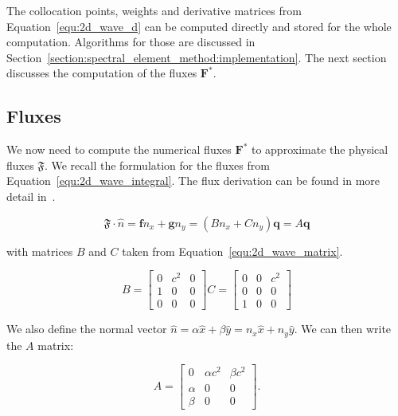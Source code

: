 The collocation points, weights and derivative matrices from Equation~\ref{equ:2d_wave_d} can be
computed directly and stored for the whole computation. Algorithms for those are discussed in
Section~\ref{section:spectral_element_method:implementation}. The next section discusses the
computation of the fluxes \(\mathbf{F}^*\).

\subsection{Fluxes}\label{subsection:spectral_element_method:dg_sem:fluxes}

We now need to compute the numerical fluxes \(\mathbf{F}^*\) to approximate the physical fluxes
\(\mathfrak{F}\). We recall the formulation for the fluxes from Equation~\ref{equ:2d_wave_integral}.
The flux derivation can be found in more detail in~\cite{Kopriva2009}.

\begin{equation} \label{equ:physical_fluxes}
	\mathfrak{F} \cdot \widehat{n} = \mathbf{f} n_x + \mathbf{g} n_y = (B n_x + C n_y) \mathbf{q} = A \mathbf{q}
\end{equation}

\noindent
with matrices \(B\) and \(C\) taken from Equation~\ref{equ:2d_wave_matrix}.

\begin{equation}
	B = \begin{bmatrix}
        0 & c^2 & 0 \\ 
        1 & 0 & 0 \\ 
        0 & 0 & 0 
	\end{bmatrix}
	C = \begin{bmatrix}
        0 & 0 & c^2\\ 
        0 & 0 & 0 \\ 
        1 & 0 & 0
	\end{bmatrix}
\end{equation}

We also define the normal vector \(\widehat{n} = \alpha \widehat{x} + \beta \widehat{y} = n_x
\widehat{x} + n_y \widehat{y}\). We can then write the \(A\) matrix:

\begin{equation}
    A = \begin{bmatrix}
        0 & \alpha c^2 & \beta c^2 \\ 
        \alpha & 0 & 0 \\ 
        \beta & 0 & 0 
	\end{bmatrix}.
\end{equation}

